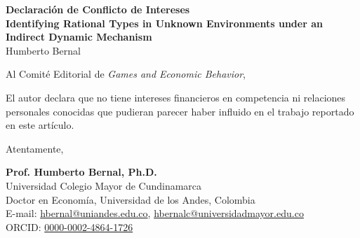 \documentclass[12pt]{article}
\begin{document}
\singlespacing

\begin{center}
\textbf{Declaración de Conflicto de Intereses} \\
\vspace{1em}
\textbf{Identifying Rational Types in Unknown Environments under an Indirect Dynamic Mechanism} \\
Humberto Bernal
\end{center}

\vspace{3em}

\noindent Al Comité Editorial de \textit{Games and Economic Behavior},

\vspace{2em}

\noindent El autor declara que no tiene intereses financieros en competencia ni relaciones personales conocidas que pudieran parecer haber influido en el trabajo reportado en este artículo.

\vspace{4em}

\begin{flushleft}
Atentamente,

\vspace{3em}

\textbf{Prof. Humberto Bernal, Ph.D.} \\
Universidad Colegio Mayor de Cundinamarca \\
Doctor en Economía, Universidad de los Andes, Colombia \\
E-mail: \href{mailto:hbernal@uniandes.edu.co}{hbernal@uniandes.edu.co}, \href{mailto:hbernalc@universidadmayor.edu.co}{hbernalc@universidadmayor.edu.co} \\
ORCID: \href{https://orcid.org/0000-0002-4864-1726}{0000-0002-4864-1726}
\end{flushleft}
\end{document}
